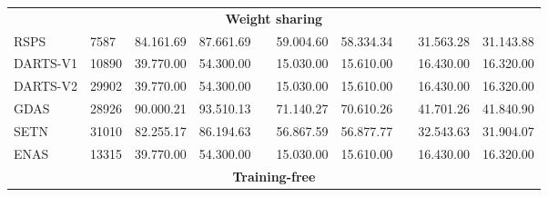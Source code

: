 \documentclass{article}
\begin{document}
\begin{table*}[!h]
\begin{adjustbox}{width=2\columnwidth,center}
\begin{tabular}{@{}llllcllcll@{}}
\multicolumn{10}{c}{\textbf{Weight sharing}}\\
RSPS                & 7587  & 84.161.69 & 87.661.69 && 59.004.60 & 58.334.34 && 31.563.28 & 31.143.88 \\
DARTS-V1            & 10890 & 39.770.00 & 54.300.00 && 15.030.00 & 15.610.00 && 16.430.00 & 16.320.00 \\
DARTS-V2            & 29902 & 39.770.00 & 54.300.00 && 15.030.00 & 15.610.00 && 16.430.00 & 16.320.00 \\
GDAS                & 28926 & 90.000.21 & 93.510.13 && 71.140.27 & 70.610.26 && 41.701.26 & 41.840.90 \\
SETN                & 31010 & 82.255.17 & 86.194.63 && 56.867.59 & 56.877.77 && 32.543.63 & 31.904.07 \\
ENAS                & 13315 & 39.770.00 & 54.300.00 && 15.030.00 & 15.610.00 && 16.430.00 & 16.320.00 \\
\midrule
\multicolumn{10}{c}{\textbf{Training-free}}\\



\end{tabular}
\end{adjustbox}
\end{table*}
\end{document}
